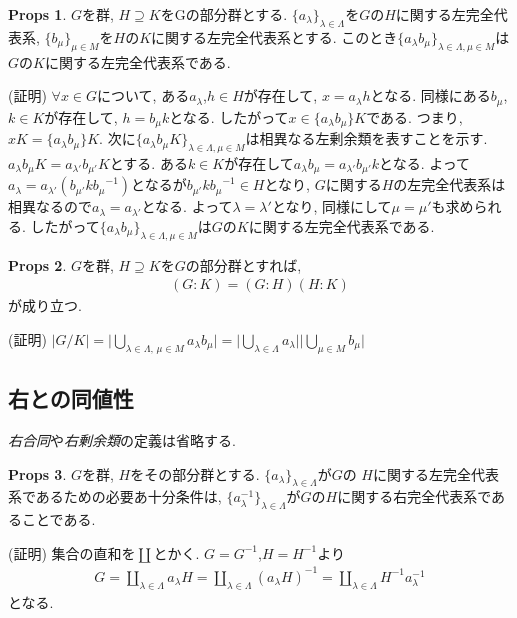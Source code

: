 \documentclass[dvipdfmx]{jsarticle}
\theoremstyle{definition}
\newtheorem{props}{Props}
\numberwithin{equation}{section}
\numberwithin{props}{section}
\numberwithin{definition}{section}
\numberwithin{note}{section}
\begin{document}
\begin{props}
     $G$を群, $H\supseteq K$をGの部分群とする. $\lbrace a_\lambda \rbrace_{\lambda \in \Lambda}$を$G$の$H$に関する左完全代表系, $\lbrace b_\mu \rbrace_{\mu \in M}$を$H$の$K$に関する左完全代表系とする. このとき$\lbrace a_\lambda b_\mu\rbrace_{\lambda\in \Lambda,\mu\in M}$は$G$の$K$に関する左完全代表系である.
\end{props}
(証明) $\forall x\in G$について, ある$a_\lambda$,$h\in H$が存在して, $x=a_\lambda h$となる. 同様にある$b_\mu$,$k\in K$が存在して, $h=b_\mu k$となる. したがって$x\in \lbrace a_\lambda b_\mu\rbrace K$である. つまり, $xK= \lbrace a_\lambda b_\mu\rbrace K$. 次に$\lbrace a_\lambda b_\mu K\rbrace_{\lambda\in \Lambda,\mu\in M}$は相異なる左剰余類を表すことを示す.
$a_\lambda b_\mu K=a_{\lambda'}b_{\mu'}K$とする. ある$k\in K$が存在して$a_\lambda b_\mu=a_{\lambda'}b_{\mu'}k$となる. よって$a_\lambda=a_{\lambda'}(b_{\mu'}k{b_\mu}^{-1})$となるが$b_{\mu'}k{b_\mu}^{-1}\in H$となり, $G$に関する$H$の左完全代表系は相異なるので$a_\lambda=a_{\lambda'}$となる. よって$\lambda=\lambda'$となり, 同様にして$\mu=\mu'$も求められる. したがって$\lbrace a_\lambda b_\mu\rbrace_{\lambda\in \Lambda,\mu\in M}$は$G$の$K$に関する左完全代表系である. 
\begin{props}
     $G$を群, $H\supseteq K$を$G$の部分群とすれば,
     \begin{align}
          (G:K)=(G:H)(H:K)
     \end{align}
     が成り立つ.
\end{props}
(証明) $\lvert G/K\rvert =\lvert \bigcup_{\lambda\in \Lambda,\,\mu\in M}a_\lambda b_\mu\rvert=\lvert \bigcup_{\lambda\in \Lambda}a_\lambda\rvert\lvert \bigcup_{\mu\in M}b_\mu\rvert$

\subsection{右との同値性}
\emph{右合同}や\emph{右剰余類}の定義は省略する.
\begin{props}
     $G$を群, $H$をその部分群とする. $\lbrace a_\lambda\rbrace_{\lambda\in \Lambda}$が$G$の
     $H$に関する左完全代表系であるための必要あ十分条件は, $\lbrace a_\lambda^{-1}\rbrace_{\lambda\in \Lambda}$が$G$の$H$に関する右完全代表系であることである.
\end{props}
(証明) 集合の直和を$\coprod$とかく. $G=G^{-1}$,$H=H^{-1}$より
\begin{align}
     G=\coprod_{\lambda\in \Lambda}a_\lambda H=\coprod_{\lambda\in \Lambda}(a_\lambda H)^{-1}=\coprod_{\lambda\in \Lambda}H^{-1}a_\lambda^{-1}
\end{align}
となる.
\end{document}
